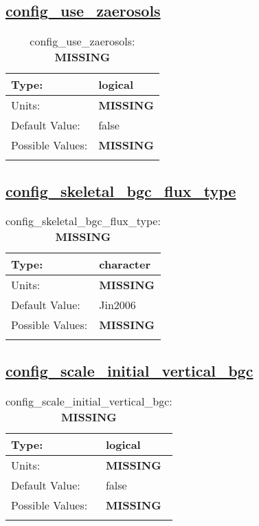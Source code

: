 \subsection[config\_use\_zaerosols]{\hyperref[sec:nm_tab_biogeochemistry]{config\_use\_zaerosols}}
\label{subsec:nm_sec_config_use_zaerosols}
\begin{center}
\begin{longtable}{| p{2.0in} || p{4.0in} |}
    \hline
    Type: & logical \\
    \hline
    Units: & {\bf \color{red} MISSING} \\
    \hline
    Default Value: & false \\
    \hline
    Possible Values: & {\bf \color{red} MISSING} \\
    \hline
    \caption{config\_use\_zaerosols: {\bf \color{red} MISSING}}
\end{longtable}
\end{center}
\subsection[config\_skeletal\_bgc\_flux\_type]{\hyperref[sec:nm_tab_biogeochemistry]{config\_skeletal\_bgc\_flux\_type}}
\label{subsec:nm_sec_config_skeletal_bgc_flux_type}
\begin{center}
\begin{longtable}{| p{2.0in} || p{4.0in} |}
    \hline
    Type: & character \\
    \hline
    Units: & {\bf \color{red} MISSING} \\
    \hline
    Default Value: & Jin2006 \\
    \hline
    Possible Values: & {\bf \color{red} MISSING} \\
    \hline
    \caption{config\_skeletal\_bgc\_flux\_type: {\bf \color{red} MISSING}}
\end{longtable}
\end{center}
\subsection[config\_scale\_initial\_vertical\_bgc]{\hyperref[sec:nm_tab_biogeochemistry]{config\_scale\_initial\_vertical\_bgc}}
\label{subsec:nm_sec_config_scale_initial_vertical_bgc}
\begin{center}
\begin{longtable}{| p{2.0in} || p{4.0in} |}
    \hline
    Type: & logical \\
    \hline
    Units: & {\bf \color{red} MISSING} \\
    \hline
    Default Value: & false \\
    \hline
    Possible Values: & {\bf \color{red} MISSING} \\
    \hline
    \caption{config\_scale\_initial\_vertical\_bgc: {\bf \color{red} MISSING}}
\end{longtable}
\end{center}
